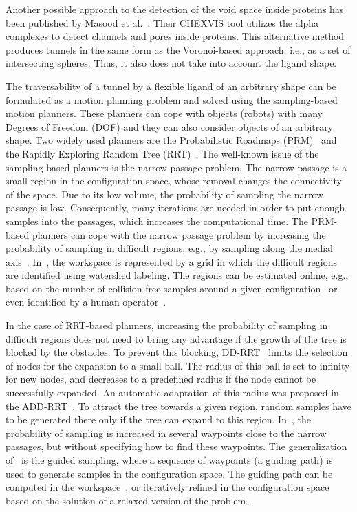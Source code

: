 \documentclass{bmcart}
\begin{document}
Another possible approach to the detection of the void space inside proteins has been published by Masood et al.~\cite{masood2015chexvis}.
Their CHEXVIS tool utilizes the alpha complexes to detect channels and pores inside proteins.
This alternative method produces tunnels in the same form as the Voronoi-based approach, i.e., as a set of intersecting spheres.
Thus, it also does not take into account the ligand shape. 

The traversability of a tunnel by a flexible ligand of an arbitrary shape can be formulated as a motion planning problem and solved using the sampling-based motion planners.
These planners can cope with objects (robots) with many Degrees of Freedom (DOF) and they can also consider objects of an arbitrary shape.
Two widely used planners are the Probabilistic Roadmaps (PRM)~\cite{kavrakiForPP} and the Rapidly Exploring Random Tree (RRT)~\cite{lavalleRRT}.
The well-known issue of the sampling-based planners is the narrow passage problem.
The narrow passage is a small region in the configuration space, whose removal changes the connectivity of the space.
Due to its low volume, the probability of sampling the narrow passage is low.
Consequently, many iterations are needed in order to put enough samples into the passages, which increases the computational time.
The PRM-based planners can cope with the narrow passage problem by increasing the probability of sampling in difficult regions, e.g., by sampling along the medial axis~\cite{wilmarthMAPRM}.
In~\cite{bergWIG}, the workspace is represented by a grid in which the difficult regions are identified using watershed labeling.
The regions can be estimated online, e.g., based on the number of collision-free samples around a given configuration~\cite{overmarsGauss,hsuBridge} or even identified by a human operator~\cite{denny2018general}. 

In the case of RRT-based planners, increasing the probability of sampling in difficult regions does not need to bring any advantage
if the growth of the tree is blocked by the obstacles.
To prevent this blocking, DD-RRT~\cite{yershovaDDRRT} limits the selection of nodes for the expansion to a small ball. 
The radius of this ball is set to infinity for new nodes, and decreases to a predefined radius if the node cannot be successfully expanded.
An automatic adaptation of this radius was proposed in the ADD-RRT~\cite{jailletADRRT}.
To attract the tree towards a given region, random samples have to be generated there only if the tree can expand to this region.
In~\cite{kardossRRTKK}, the probability of sampling is increased in several waypoints close to the narrow passages, but without specifying how to find these waypoints.
The generalization of~\cite{kardossRRTKK} is the guided sampling, where a sequence of waypoints (a guiding path) is used to generate samples in the configuration space.
The guiding path can be computed in the workspace~\cite{vonasek2009rrt}, or iteratively refined in the configuration space based on the solution of a relaxed version of the problem~\cite{bayazitIRC}.
\end{document}
